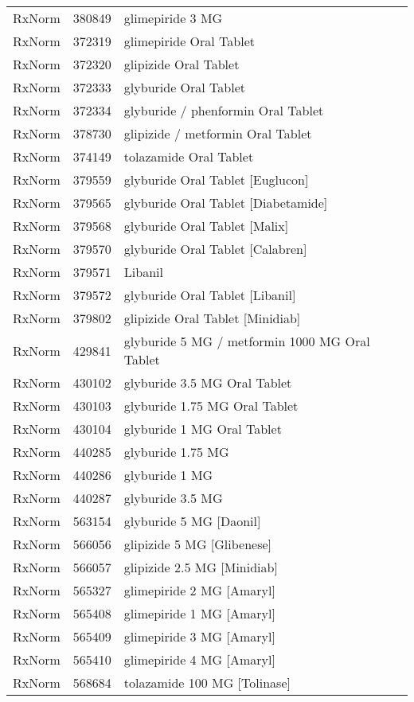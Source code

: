 \begin{longtable}{p{}p{}p{}}
  RxNorm & 380849 & glimepiride 3 MG \\ 
  RxNorm & 372319 & glimepiride Oral Tablet \\ 
  RxNorm & 372320 & glipizide Oral Tablet \\ 
  RxNorm & 372333 & glyburide Oral Tablet \\ 
  RxNorm & 372334 & glyburide / phenformin Oral Tablet \\ 
  RxNorm & 378730 & glipizide / metformin Oral Tablet \\ 
  RxNorm & 374149 & tolazamide Oral Tablet \\ 
  RxNorm & 379559 & glyburide Oral Tablet [Euglucon] \\ 
  RxNorm & 379565 & glyburide Oral Tablet [Diabetamide] \\ 
  RxNorm & 379568 & glyburide Oral Tablet [Malix] \\ 
  RxNorm & 379570 & glyburide Oral Tablet [Calabren] \\ 
  RxNorm & 379571 & Libanil \\ 
  RxNorm & 379572 & glyburide Oral Tablet [Libanil] \\ 
  RxNorm & 379802 & glipizide Oral Tablet [Minidiab] \\ 
  RxNorm & 429841 & glyburide 5 MG / metformin 1000 MG Oral Tablet \\ 
  RxNorm & 430102 & glyburide 3.5 MG Oral Tablet \\ 
  RxNorm & 430103 & glyburide 1.75 MG Oral Tablet \\ 
  RxNorm & 430104 & glyburide 1 MG Oral Tablet \\ 
  RxNorm & 440285 & glyburide 1.75 MG \\ 
  RxNorm & 440286 & glyburide 1 MG \\ 
  RxNorm & 440287 & glyburide 3.5 MG \\ 
  RxNorm & 563154 & glyburide 5 MG [Daonil] \\ 
  RxNorm & 566056 & glipizide 5 MG [Glibenese] \\ 
  RxNorm & 566057 & glipizide 2.5 MG [Minidiab] \\ 
  RxNorm & 565327 & glimepiride 2 MG [Amaryl] \\ 
  RxNorm & 565408 & glimepiride 1 MG [Amaryl] \\ 
  RxNorm & 565409 & glimepiride 3 MG [Amaryl] \\ 
  RxNorm & 565410 & glimepiride 4 MG [Amaryl] \\ 
  RxNorm & 568684 & tolazamide 100 MG [Tolinase] \\ 

\end{longtable}
